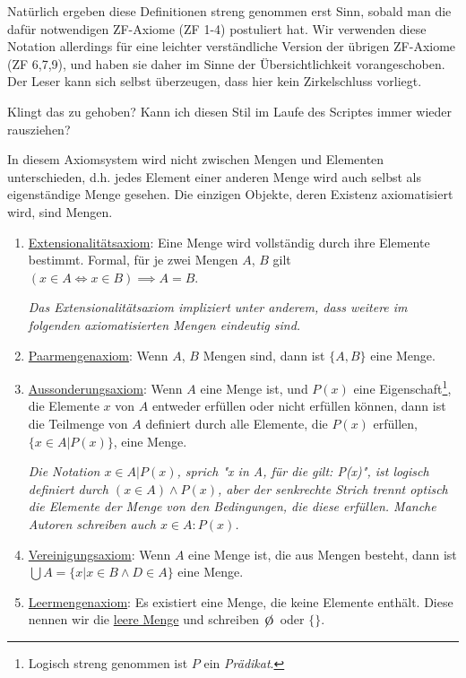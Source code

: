 Natürlich ergeben diese Definitionen streng genommen erst Sinn, sobald man die dafür notwendigen ZF-Axiome (ZF 1-4) postuliert hat. Wir verwenden diese Notation allerdings für eine leichter verständliche Version der übrigen ZF-Axiome (ZF 6,7,9), und haben sie daher im Sinne der Übersichtlichkeit vorangeschoben. Der Leser kann sich selbst überzeugen, dass hier kein Zirkelschluss vorliegt.

\begin{query}
    Klingt das zu gehoben? Kann ich diesen Stil im Laufe des Scriptes immer wieder rausziehen?
\end{query}

\begin{axiom} %
    \label{ZF-axioms}
    In diesem Axiomsystem wird nicht zwischen Mengen und Elementen unterschieden, d.h. jedes Element einer anderen Menge wird auch selbst als eigenständige Menge gesehen. Die einzigen Objekte, deren Existenz axiomatisiert wird, sind Mengen.
    \begin{enumerate}[label=(ZF\arabic*)]
        \item \underline{Extensionalitätsaxiom}: Eine Menge wird vollständig durch ihre Elemente bestimmt. Formal, für je zwei Mengen $A$, $B$ gilt $(x \in A \iff x \in B) \implies A = B$.
        
        \emph{Das Extensionalitätsaxiom impliziert unter anderem, dass weitere im folgenden axiomatisierten Mengen eindeutig sind.}
        \item \underline{Paarmengenaxiom}: Wenn $A$, $B$ Mengen sind, dann ist $\{A, B\}$ eine Menge.
        \item \underline{Aussonderungsaxiom}: Wenn $A$ eine Menge ist, und $P(x)$ eine Eigenschaft\footnote{Logisch streng genommen ist $P$ ein \emph{Prädikat}.}, die Elemente $x$ von $A$ entweder erfüllen oder nicht erfüllen können, dann ist die Teilmenge von $A$ definiert durch alle Elemente, die $P(x)$ erfüllen, $\{x \in A | P(x)\}$, eine Menge.
        
        \emph{Die Notation $x \in A | P(x)$, sprich "x in A, für die gilt: P(x)", ist logisch definiert durch $(x \in A) \land P(x)$, aber der senkrechte Strich trennt optisch die Elemente der Menge von den Bedingungen, die diese erfüllen. Manche Autoren schreiben auch $x \in A : P(x)$.}
        \item \underline{Vereinigungsaxiom}: Wenn $A$ eine Menge ist, die aus Mengen besteht, dann ist $\bigcup A = \{x | x \in B \land D \in A\}$ eine Menge.
        \item \underline{Leermengenaxiom}: Es existiert eine Menge, die keine Elemente enthält. Diese nennen wir die \underline{leere Menge} und schreiben $\e$ oder $\{\}$.
        

\end{enumerate}
\end{axiom}
